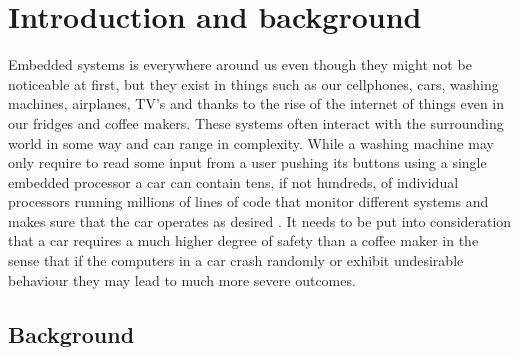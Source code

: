 \documentclass{kththesis}
\begin{document}
\printglossary[title={Acronyms}]

\tableofcontents

\mainmatter


\chapter{Introduction and background} 

Embedded systems is everywhere around us even though they might not be noticeable at first,
but they exist in things such as our cellphones, cars, washing machines, airplanes, TV's and thanks
to the rise of the internet of things even in our fridges and coffee makers. These systems often
interact with the surrounding world in some way and can range in complexity. While a washing
machine may only require to read some input from a user pushing its buttons using a single embedded
processor a car can contain tens, if not hundreds, of individual processors running millions of
lines of code that monitor different systems and makes sure that the car operates as
desired \parencite{doughty-white_million_nodate}. It needs to be put into consideration that a car
requires a much higher degree of safety than a coffee maker in the sense that if the computers in a
car crash randomly or exhibit undesirable behaviour they may lead to much more severe outcomes.






\section{Background}
\end{document}
